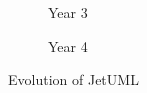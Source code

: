 \begin{figure}[ht]
    \medskip
    \begin{subfigure}{0.48\textwidth}
        \caption{Year 3} 
        \label{fig:JetUML_V3S3}
    \end{subfigure}\hspace*{\fill}
    \begin{subfigure}{0.48\textwidth}
        \caption{Year 4} 
        \label{fig:JetUML_V3S4}
    \end{subfigure}
        
    \caption{Evolution of JetUML} 
    \label{fig:JetUML_V3}
\end{figure}


